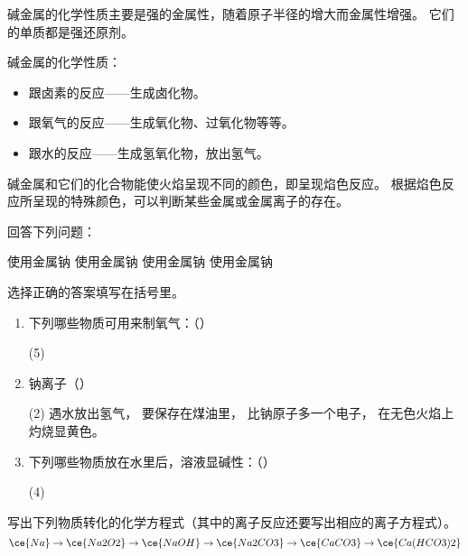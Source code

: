 碱金属的化学性质主要是强的金属性，随着原子半径的增大而金属性增强。
它们的单质都是强还原剂。

碱金属的化学性质：
\begin{itemize}
  \item 跟卤素的反应——生成卤化物。
  \item 跟氧气的反应——生成氧化物、过氧化物等等。
  \item 跟水的反应——生成氢氧化物，放出氢气。
\end{itemize}

碱金属和它们的化合物能使火焰呈现不同的颜色，即呈现焰色反应。
根据焰色反应所呈现的特殊颜色，可以判断某些金属或金属离子的存在。

\begin{Review}
  \begin{question}
    \item 回答下列问题：
    \begin{tasks}
      \task 使用金属钠
      \task 使用金属钠
      \task 使用金属钠
      \task 使用金属钠
    \end{tasks}
    \item 
    \item 选择正确的答案填写在括号里。
    \begin{enumerate}[itemindent=1.7em]
      \item 下列哪些物质可用来制氧气：\hfill（\hspace{2em}）
      \begin{tasks}(5)
        \task {}
        \task {}
        \task {}
        \task {}
        \task {}
      \end{tasks}
      \item 钠离子\hfill（\hspace{2em}）
      \begin{tasks}(2)
        \task 遇水放出氢气，
        \task 要保存在煤油里，
        \task 比钠原子多一个电子，
        \task 在无色火焰上灼烧显黄色。
      \end{tasks}
      \item 下列哪些物质放在水里后，溶液显碱性：\hfill（\hspace{2em}）
      \begin{tasks}(4)
        \task {}
        \task {}
        \task {}
        \task {}
      \end{tasks}
    \end{enumerate}
    \item 写出下列物质转化的化学方程式（其中的离子反应还要写出相应的离子方程式）。
    \[ \ce{Na} \to \ce{Na2O2} \to \ce{NaOH} \to \ce{Na2CO3} \to \ce{CaCO3} \to \ce{Ca(HCO3)2}\]
  \end{question}
\end{Review}